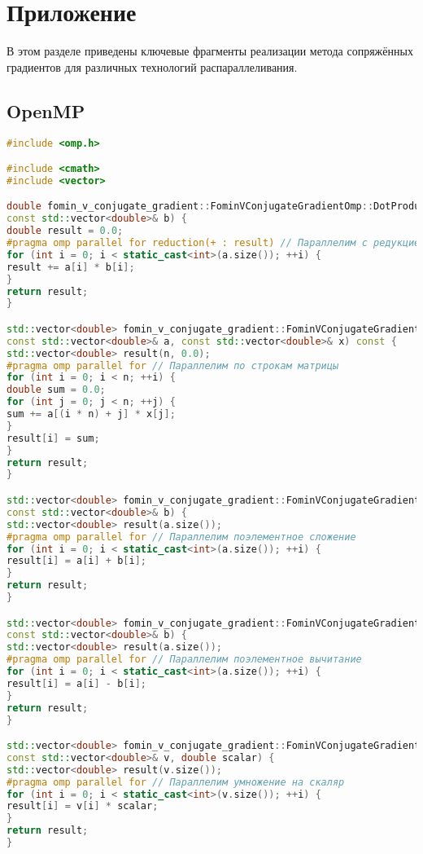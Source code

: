 \documentclass[12pt]{article}
\begin{document}
\section*{Приложение}

В этом разделе приведены ключевые фрагменты реализации метода сопряжённых градиентов для различных технологий распараллеливания.

\subsection*{OpenMP}
\begin{lstlisting}[language=C++]
#include <omp.h>

#include <cmath>
#include <vector>

double fomin_v_conjugate_gradient::FominVConjugateGradientOmp::DotProduct(const std::vector<double>& a,
const std::vector<double>& b) {
double result = 0.0;
#pragma omp parallel for reduction(+ : result) // Параллелим с редукцией
for (int i = 0; i < static_cast<int>(a.size()); ++i) {
result += a[i] * b[i];
}
return result;
}

std::vector<double> fomin_v_conjugate_gradient::FominVConjugateGradientOmp::MatrixVectorMultiply(
const std::vector<double>& a, const std::vector<double>& x) const {
std::vector<double> result(n, 0.0);
#pragma omp parallel for // Параллелим по строкам матрицы
for (int i = 0; i < n; ++i) {
double sum = 0.0;
for (int j = 0; j < n; ++j) {
sum += a[(i * n) + j] * x[j];
}
result[i] = sum;
}
return result;
}

std::vector<double> fomin_v_conjugate_gradient::FominVConjugateGradientOmp::VectorAdd(const std::vector<double>& a,
const std::vector<double>& b) {
std::vector<double> result(a.size());
#pragma omp parallel for // Параллелим поэлементное сложение
for (int i = 0; i < static_cast<int>(a.size()); ++i) {
result[i] = a[i] + b[i];
}
return result;
}

std::vector<double> fomin_v_conjugate_gradient::FominVConjugateGradientOmp::VectorSub(const std::vector<double>& a,
const std::vector<double>& b) {
std::vector<double> result(a.size());
#pragma omp parallel for // Параллелим поэлементное вычитание
for (int i = 0; i < static_cast<int>(a.size()); ++i) {
result[i] = a[i] - b[i];
}
return result;
}

std::vector<double> fomin_v_conjugate_gradient::FominVConjugateGradientOmp::VectorScalarMultiply(
const std::vector<double>& v, double scalar) {
std::vector<double> result(v.size());
#pragma omp parallel for // Параллелим умножение на скаляр
for (int i = 0; i < static_cast<int>(v.size()); ++i) {
result[i] = v[i] * scalar;
}
return result;
}


\end{lstlisting}
\end{document}
